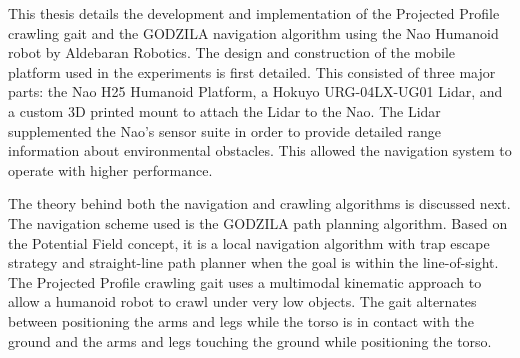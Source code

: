 {}
{
This thesis details the development and implementation of the Projected Profile
crawling gait and the GODZILA navigation algorithm using the Nao Humanoid
robot by Aldebaran Robotics.
The design and construction of the mobile platform used in the experiments is 
first detailed. This consisted of three major parts: the Nao H25 Humanoid
Platform, a Hokuyo URG-04LX-UG01 Lidar, and a custom 3D printed mount to
attach the Lidar to the Nao.
The Lidar supplemented the Nao's sensor suite in order to provide detailed
range information about environmental obstacles. This allowed the navigation
system to operate with higher performance. 

The theory behind both the navigation and crawling algorithms is discussed
next. 
The navigation scheme used is the GODZILA path planning algorithm.
Based on the Potential Field concept, it is a local
navigation algorithm with trap escape strategy and straight-line path planner 
when the goal is within the line-of-sight.
The Projected Profile crawling gait uses a multimodal kinematic approach to
allow a humanoid robot to crawl under very low objects.
The gait alternates between positioning the arms and legs while the torso is in
contact with the ground and the arms and legs touching the ground while 
positioning the torso.

}
